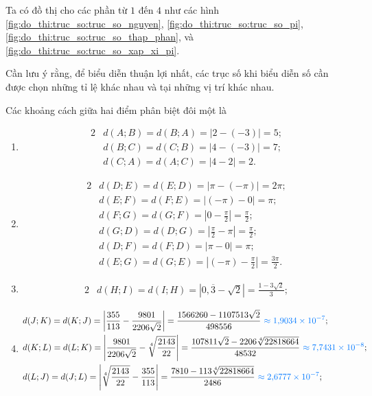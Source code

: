 Ta có đồ thị cho các phần từ $1$ đến $4$ như các hình \ref{fig:do_thi:truc_so:truc_so_nguyen}, \ref{fig:do_thi:truc_so:truc_so_pi}, \ref{fig:do_thi:truc_so:truc_so_thap_phan}, và \ref{fig:do_thi:truc_so:truc_so_xap_xi_pi}.

Cần lưu ý rằng, để biểu diễn thuận lợi nhất, các trục số khi biểu diễn số cần được chọn những tỉ lệ khác nhau và tại những vị trí khác nhau.

Các khoảng cách giữa hai điểm phân biệt đôi một là
\begin{enumerate}
   \item \begin{alignat*}{2}
      &d(A;B) = d(B;A) = \left|2 - (-3)\right| = 5; \\
      &d(B;C) = d(C;B) = \left|4 - (-3)\right| = 7; \\
      &d(C;A) = d(A;C) = \left|4 - 2\right| = 2.
   \end{alignat*}
   \item \begin{alignat*}{2}
      &d(D;E) = d(E;D) = \left|\pi - (-\pi)\right| = 2\pi; \\
      &d(E;F) = d(F;E) = \left|(-\pi) - 0\right| = \pi; \\
      &d(F;G) = d(G;F) = \left|0 - \frac{\pi}{2}\right| = \frac{\pi}{2}; \\
      &d(G;D) = d(D;G) = \left|\frac{\pi}{2} - \pi\right| = \frac{\pi}{2}; \\
      &d(D;F) = d(F;D) = \left|\pi - 0\right| = \pi;\\
      &d(E;G) = d(G;E) = \left|(-\pi) - \frac{\pi}{2}\right| = \frac{3\pi}{2}.
   \end{alignat*}
   \item \begin{alignat*}{2}
      &d(H;I) = d(I;H) = \left|0{,}\overline{3} - \sqrt{2}\right| = \frac{1-3\sqrt{2}}{3};
   \end{alignat*}
   \item \begin{alignat*}{2}
      &d(J;K) = d(K;J) = \left|\frac{355}{113} - \frac{9801}{2206\sqrt{2}}\right| = \frac{1566260-1107513\sqrt{2}}{498556} \textcolor{colorEmphasisCyan}{~\approx 1{,}9034\times 10^{-7}}; \\
      &d(K;L) = d(L;K) = \left|\frac{9801}{2206\sqrt{2}} - \sqrt[4]{\frac{2143}{22}}\right| = \frac{107811\sqrt{2}-2206\sqrt[4]{22818664}}{48532} \textcolor{colorEmphasisCyan}{~\approx 7{,}7431\times 10^{-8}}; \\
      &d(L;J) = d(J;L) = \left|\sqrt[4]{\frac{2143}{22}} - \frac{355}{113}\right| = \frac{7810-113\sqrt[4]{22818664}}{2486} \textcolor{colorEmphasisCyan}{~\approx 2{,}6777\times 10^{-7}};
   \end{alignat*}
\end{enumerate}

